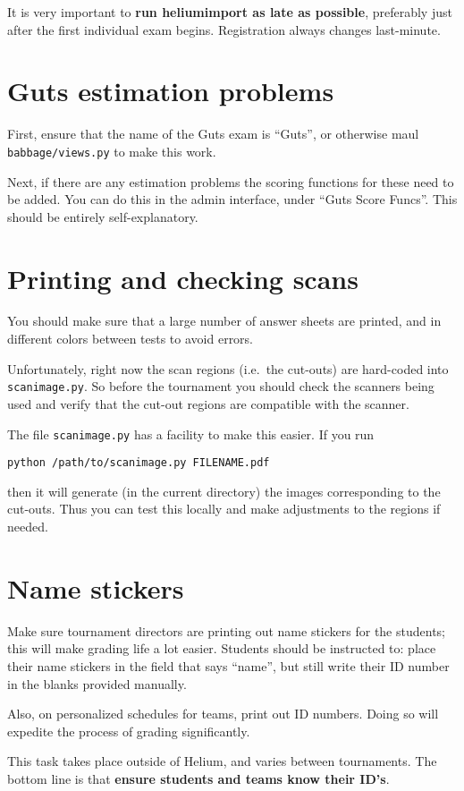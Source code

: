 It is very important to \textbf{run heliumimport as late as possible},
preferably just after the first individual exam begins.
Registration always changes last-minute.

\section{Guts estimation problems}
First, ensure that the name of the Guts exam is ``Guts'',
or otherwise maul \texttt{babbage/views.py} to make this work.

Next, if there are any estimation problems the scoring functions
for these need to be added.
You can do this in the admin interface, under ``Guts Score Funcs''.
This should be entirely self-explanatory.

\section{Printing and checking scans}
You should make sure that a large number of answer sheets are printed,
and in different colors between tests to avoid errors.

Unfortunately, right now the scan regions (i.e.\ the cut-outs)
are hard-coded into \verb+scanimage.py+.
So before the tournament you should check the scanners being used
and verify that the cut-out regions are compatible with the scanner.

The file \verb+scanimage.py+ has a facility to make this easier.
If you run
\begin{center}
\verb+python /path/to/scanimage.py FILENAME.pdf+
\end{center}
then it will generate (in the current directory)
the images corresponding to the cut-outs.
Thus you can test this locally and make adjustments to the regions if needed.
\section{Name stickers}
Make sure tournament directors are printing out name stickers for the students;
this will make grading life a lot easier.
Students should be instructed to:
place their name stickers in the field that says ``name'',
but still write their ID number in the blanks provided manually.

Also, on personalized schedules for teams, print out ID numbers.
Doing so will expedite the process of grading significantly.

This task takes place outside of Helium, and varies between tournaments.
The bottom line is that \textbf{ensure students and teams know their ID's}.


